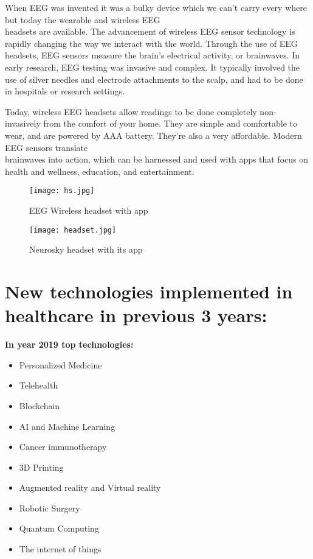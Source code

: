 \documentclass[12pt,a4paper]{article}
\begin{document}
When EEG was invented it was a bulky device which we can't carry every where but today the wearable and wireless EEG\\ headsets are available. The advancement of wireless EEG sensor technology is rapidly changing the way we interact with the world. Through the use of EEG headsets, EEG sensors measure the brain's electrical activity, or brainwaves. In early research, EEG testing was invasive and complex. It typically involved the use of silver needles and  electrode attachments to the scalp, and had to be done in hospitals or research settings.


Today, wireless EEG headsets allow readings to be done completely non-invasively from the comfort of your home. They are simple and comfortable to wear, and are powered by AAA battery. They're also a very affordable. Modern EEG sensors translate\\ brainwaves into action, which can be harnessed and used with apps that focus on health and wellness, education, and entertainment.

\begin{figure}[h]
\centering
\texttt{[image: hs.jpg]}
\caption{EEG Wireless headset with app}
\end{figure}

\begin{figure}[h]
\centering
\texttt{[image: headset.jpg]}
\caption{Neurosky headset with its app}
\end{figure}

\clearpage




\section{New technologies implemented in healthcare in previous 3 years:}

\textbf {In year 2019 top technologies:}
\begin{itemize}
\item Personalized Medicine
\item Telehealth
\item Blockchain
\item AI and Machine Learning
\item Cancer immunotherapy
\item 3D Printing
\item Augmented reality and Virtual reality
\item Robotic Surgery
\item Quantum Computing
\item The internet of things
\end{itemize}
\end{document}
